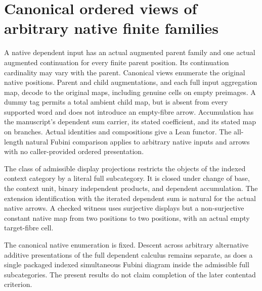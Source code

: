 \documentclass{article}
\begin{document}
\section*{Canonical ordered views of arbitrary native finite families}
A native dependent input has an actual augmented parent family
and one actual augmented continuation for every finite parent
position. Its continuation cardinality may vary with the parent.
Canonical views enumerate the original native positions.
Parent and child augmentations, and each full input aggregation
map, decode to the original maps, including genuine cells on
empty preimages. A dummy tag permits a total ambient child map,
but is absent from every supported word and does not introduce
an empty-fibre arrow. Accumulation has the manuscript's dependent
sum carrier, its stated coefficient, and its stated map on
branches. Actual identities and compositions give a Lean functor.
The all-length natural Fubini comparison applies to arbitrary native
inputs and arrows with no caller-provided ordered presentation.

The class of admissible display projections restricts the objects
of the indexed context category by a literal full subcategory.
It is closed under change of base, the context unit, binary
independent products, and dependent accumulation. The extension
identification with the iterated dependent sum is natural for the
actual native arrows. A checked witness uses surjective displays
but a non-surjective constant native map from two positions to
two positions, with an actual empty target-fibre cell.

The canonical native enumeration is fixed. Descent across arbitrary
alternative additive presentations of the full dependent calculus
remains separate, as does a single packaged indexed simultaneous
Fubini diagram inside the admissible full subcategories. The present
results do not claim completion of the later contentad criterion.
\end{document}

